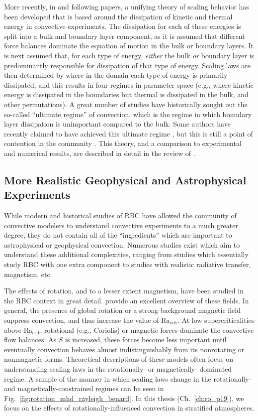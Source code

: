 More recently, in \citet{grossman&lohse2000} and following papers, a unifying theory of scaling behavior has been developed that is based around the dissipation of kinetic and thermal energy in convective experiments.
The dissipation for each of these energies is split into a bulk and boundary layer component, as it is assumed that different force balances dominate the equation of motion in the bulk or boundary layers.
It is next assumed that, for each type of energy, \emph{either} the bulk \emph{or} boundary layer is predominantly responsible for dissipation of that type of energy.
Scaling laws are then determined by where in the domain each type of energy is primarily dissipated, and this results in four regimes in parameter space (e.g., where kinetic energy is dissipated in the boundaries but thermal is dissipated in the bulk, and other permutations).
A great number of studies have historically sought out the so-called ``ultimate regime'' of convection, which is the regime in which boundary layer dissipation is unimportant compared to the bulk.
Some authors have recently claimed to have achieved this ultimate regime \citep[see e.g.,][]{zhu&all2018}, but this is still a point of contention in the community \citep{doering&all2019a, doering&all2019b}.
This theory, and a comparison to experimental and numerical results, are described in detail in the review of \citet{ahlers&all2009}.

\subsection{More Realistic Geophysical and Astrophysical Experiments}
While modern and historical studies of RBC have allowed the community of convective modelers to understand convective experiments to a much greater degree, they do not contain all of the ``ingredients'' which are important to astrophysical or geophysical convection.
Numerous studies exist which aim to understand these additional complexities, ranging from studies which essentially study RBC with one extra component to studies with realistic radiative transfer, magnetism, etc.

The effects of rotation, and to a lesser extent magnetism, have been studied in the RBC context in great detail.
\citet{plumley&julien2019} provide an excellent overview of these fields.
In general, the presence of global rotation or a strong background magnetic field suppress convection, and thus increase the value of Ra$_{\text{crit}}$.
At low supercriticalities above Ra$_{\text{crit}}$, rotational (e.g., Coriolis) or magnetic forces dominate the convective flow balances.
As $S$ is increased, these forces become less important until eventually convection behaves almost indistinguishably from its nonrotating or nonmagnetic forms.
Theoretical descriptions of these models often focus on understanding scaling laws in the rotationally- \citep[e.g.,][]{julien&all2012} or magnetically- \citep[e.g.,][]{cioni&all2000} dominated regime.
A sample of the manner in which scaling laws change in the rotationally- and magnetically-constrained regimes can be seen in Fig.~\ref{fig:rotation_mhd_rayleigh_benard}.
In this thesis (Ch.~\ref{ch:ro_p19}), we focus on the effects of rotationally-influenced convection in stratified atmospheres.

